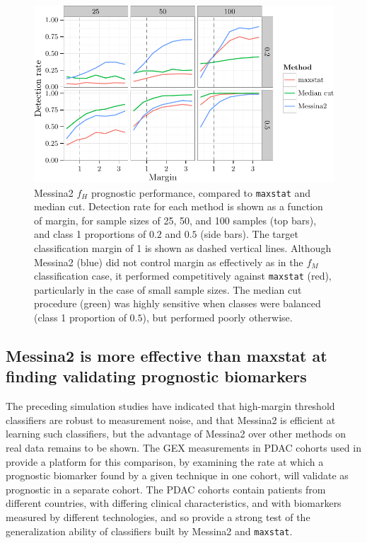 \documentclass[dissertation.tex]{subfiles}
\begin{document}
\begin{figure}[!htbp]
\centering
\includegraphics[width=\linewidth]{analysis/messina/figure/06-E2B-E2B-plots-1}
\caption[Messina2 prognostic performance compared to alternative methods]{Messina2 $f_H$ prognostic performance, compared to \texttt{maxstat} and median cut.  Detection rate for each method is shown as a function of margin, for sample sizes of 25, 50, and 100 samples (top bars), and class 1 proportions of $0.2$ and $0.5$ (side bars).  The target classification margin of 1 is shown as dashed vertical lines.  Although Messina2 (blue) did not control margin as effectively as in the $f_M$ classification case, it performed competitively against \texttt{maxstat} (red), particularly in the case of small sample sizes.  The median cut procedure (green) was highly sensitive when classes were balanced (class 1 proportion of $0.5$), but performed poorly otherwise.}\label{fig:mess-vs-maxstat}
\end{figure}

\subsection[Messina2 vs maxstat: prognostic classifier training]{Messina2 is more effective than maxstat at finding validating prognostic biomarkers}
The preceding simulation studies have indicated that high-margin threshold classifiers are robust to measurement noise, and that Messina2 is efficient at learning such classifiers, but the advantage of Messina2 over other methods on real data remains to be shown.  The \gls{GEX} measurements in \gls{PDAC} cohorts used in  provide a platform for this comparison, by examining the rate at which a prognostic biomarker found by a given technique in one cohort, will validate as prognostic in a separate cohort.  The \gls{PDAC} cohorts contain patients from different countries, with differing clinical characteristics, and with biomarkers measured by different technologies, and so provide a strong test of the generalization ability of classifiers built by Messina2 and \texttt{maxstat}.
\end{document}
